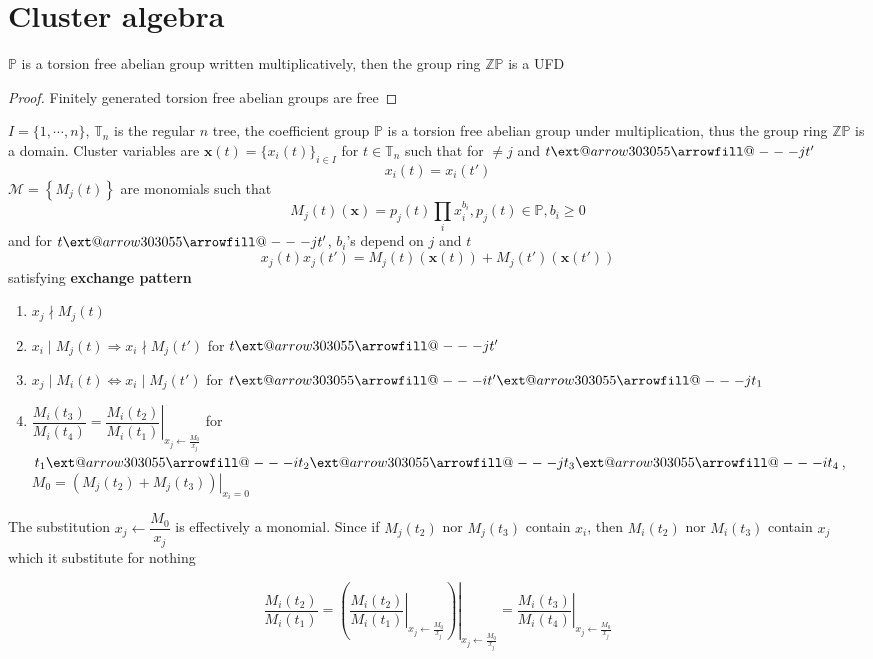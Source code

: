 \documentclass[main]{subfiles}
\begin{document}
\tableofcontents
\newpage

\section{Cluster algebra}

\makeatletter
\newcommand*{\xedge}[2][]{\ext@arrow {30}{30}55{\arrowfill@\relbar-\relbar}{#1}{#2}}
\newcommand*{\xdirectededge}[2][]{\ext@arrow {30}{30}55{\arrowfill@\relbar-\rightarrow}{#1}{#2}}
\makeatother

\begin{lemma}\label{ZP is a UFD}
$\mathbb P$ is a torsion free abelian group written multiplicatively, then the group ring $\mathbb{ZP}$ is a UFD
\end{lemma}

\begin{proof}
Finitely generated torsion free abelian groups are free
\end{proof}

\begin{definition}
$I=\{1,\cdots,n\}$, $\mathbb T_n$ is the regular $n$ tree, the coefficient group $\mathbb P$ is a torsion free abelian group under multiplication, thus the group ring $\mathbb{ZP}$ is a domain. Cluster variables are $\mathbf{x}(t)=\{x_i(t)\}_{i\in I}$ for $t\in \mathbb T_n$ such that for $\neq j$ and $t\xedge jt'$
\[x_i(t)=x_i(t')\]
$\mathcal M=\left\{M_j(t)\right\}$ are monomials such that
\[M_j(t)(\mathbf x)=p_j(t)\prod_i x_i^{b_i}, p_j(t)\in\mathbb P, b_i\geq0\]
and for $t\xedge jt'$, $b_i$'s depend on $j$ and $t$
\[x_j(t)x_j(t')=M_j(t)(\mathbf x(t))+M_j(t')(\mathbf x(t'))\]
satisfying \textbf{exchange pattern}
\begin{enumerate}[label=(E\arabic*), leftmargin=*]
\item $x_j\nmid M_j(t)$
\item $x_i\mid M_j(t)\Rightarrow x_i\nmid M_j(t')$ for $t\xedge{j}t'$
\item $x_j\mid M_i(t)\Leftrightarrow x_i\mid M_j(t')$ for $t\xedge it'\xedge jt_1$
\item $\dfrac{M_i(t_3)}{M_i(t_4)}=\left.\dfrac{M_i(t_2)}{M_i(t_1)}\right|_{x_j\leftarrow\frac{M_0}{x_j}}$ for $t_1\xedge{i} t_2\xedge jt_3\xedge it_4$, $M_0=\left.(M_j(t_2)+M_j(t_3))\right|_{x_i=0}$
\end{enumerate}
\end{definition}

\begin{remark}
The substitution $x_j\leftarrow\dfrac{M_0}{x_j}$ is effectively a monomial. Since if $M_j(t_2)$ nor $M_j(t_3)$ contain $x_i$, then $M_i(t_2)$ nor $M_i(t_3)$ contain $x_j$ which it substitute for nothing \par
\[\dfrac{M_i(t_2)}{M_i(t_1)}=\left.\left(\left.\dfrac{M_i(t_2)}{M_i(t_1)}\right|_{x_j\leftarrow\frac{M_0}{x_j}}\right)\right|_{x_j\leftarrow\frac{M_0}{x_j}}=\left.\dfrac{M_i(t_3)}{M_i(t_4)}\right|_{x_j\leftarrow\frac{M_0}{x_j}}\]
\end{remark}
\end{document}
